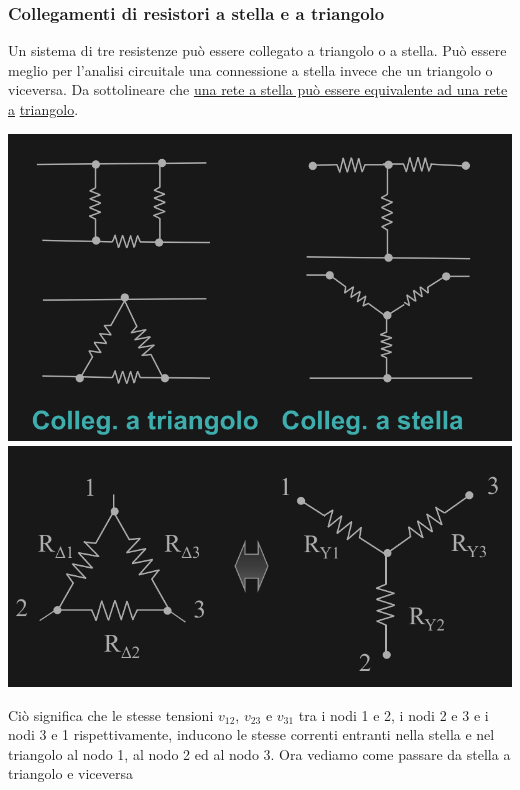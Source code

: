 \documentclass{article}
\begin{document}
\subsubsection{Collegamenti di resistori a stella e a triangolo}
Un sistema di tre resistenze
può essere collegato a
triangolo o a stella. Può essere
meglio per l'analisi circuitale
una connessione a stella invece
che un triangolo o viceversa.
Da sottolineare che \underline{una rete a stella può essere equivalente ad una rete a} \underline{triangolo}.
\begin{center}
    \includegraphics[scale=0.3]{Image/Stella triangolo.png}
    \includegraphics[scale=0.3]{Image/Nodi triangolo stella.png}
\end{center}
Ciò significa che le stesse tensioni $v_{12}$, $v_{23}$ e $v_{31}$ tra i nodi 1 e
2, i nodi 2 e 3 e i nodi 3 e 1 rispettivamente, inducono le
stesse correnti entranti nella
stella e nel triangolo al nodo 1,
al nodo 2 ed al nodo 3.
Ora vediamo come passare da stella a triangolo e viceversa
\end{document}
